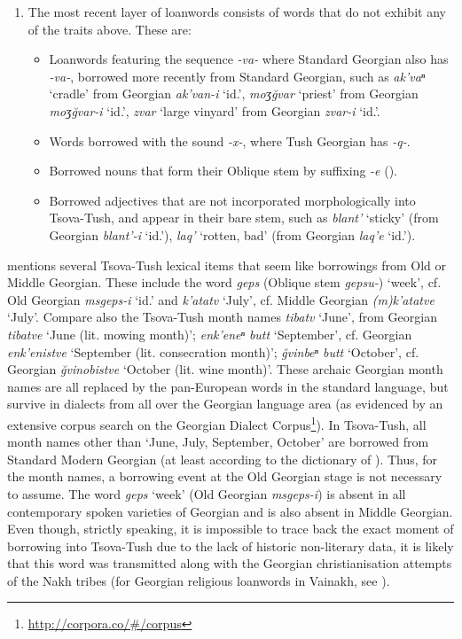 \begin{enumerate}
	\item The most recent layer of loanwords consists of words that do not exhibit any of the traits above. These are:
	
	\begin{itemize}
		\item Loanwords featuring the sequence  \textit{-va-} where Standard Georgian also has \textit{-va-}, borrowed more recently from Standard Georgian, such as \textit{ak'vaⁿ} `cradle' from Georgian \textit{ak'van-i} `id.', \textit{moʒ\u{g}var} `priest' from Georgian \textit{moʒ\u{g}var-i}  `id.', \textit{zvar} `large vinyard' from Georgian \textit{zvar-i}  `id.'.
		\item Words borrowed with the sound \textit{-x-}, where Tush Georgian has \textit{-q-}.
		\item Borrowed nouns that form their Oblique stem by suffixing \textit{-e} ().
		\item Borrowed adjectives that are not incorporated morphologically into Tsova-Tush, and appear in their bare stem, such as \textit{blant'} `sticky' (from Georgian \textit{blant'-i} `id.'), \textit{laq'} `rotten, bad' (from Georgian \textit{laq'e} `id.').
	\end{itemize}
	
\end{enumerate}

\textcite{gippert08} mentions several Tsova-Tush lexical items that seem like borrowings from Old or Middle Georgian. These include the word \textit{geps} (Oblique stem \textit{gepsu-}) `week', cf. Old Georgian \textit{msgeps-i} `id.' and \textit{k'atatv} `July', cf. Middle Georgian \textit{(m)k'atatve} `July'. Compare also the Tsova-Tush month names \textit{tibatv} `June', from Georgian \textit{tibatve} `June (lit. mowing month)'; \textit{enk'eneⁿ butt} `September', cf. Georgian \textit{enk'enistve} `September (lit. consecration month)'; \textit{\u{g}vinbeⁿ butt} `October', cf. Georgian \textit{\u{g}vinobistve} `October (lit. wine month)'. These archaic Georgian month names are all replaced by the pan-European words in the standard language, but survive in dialects from all over the Georgian language area (as evidenced by an extensive corpus search on the Georgian Dialect Corpus\footnote{\url{http://corpora.co/\#/corpus}}). 
In Tsova-Tush, all month names other than `June, July, September, October' are borrowed from Standard Modern Georgian (at least according to the dictionary of \textcite{kadkad84}). Thus, for the month names, a borrowing event at the Old Georgian stage is not necessary to assume. The word \textit{geps} `week' (Old Georgian \textit{msgeps-i}) is absent in all contemporary spoken varieties of Georgian and is also absent in Middle Georgian. Even though, strictly speaking, it is impossible to trace back the exact moment of borrowing into Tsova-Tush due to the lack of historic non-literary data, it is likely that this word was transmitted along with the Georgian christianisation attempts of the Nakh tribes (for Georgian religious loanwords in Vainakh, see \textcite{khalilov04contact}).





